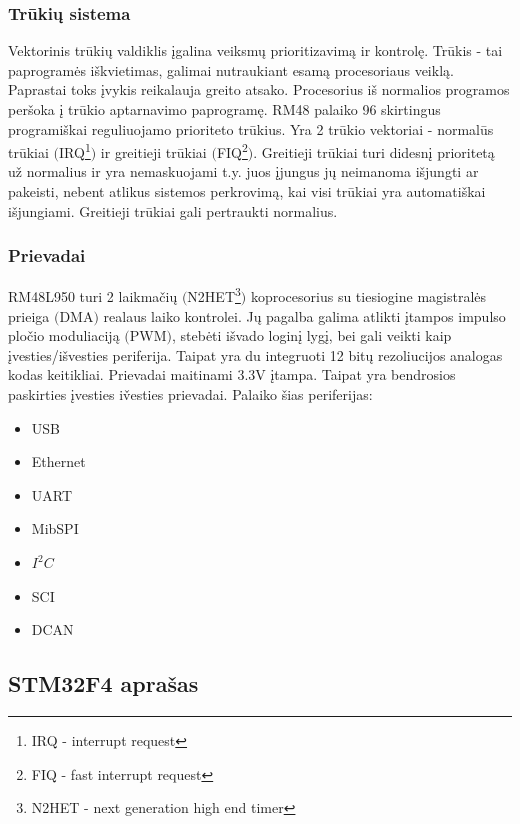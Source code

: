 \documentclass[a4paper, 12pt]{article} %
\begin{document}
\begin{onehalfspacing}
\subsubsection{Tr\=uki\k{u} sistema}
Vektorinis tr\=uki\k{u} valdiklis \k{i}galina veiksm\k{u} prioritizavim\k{a} ir kontrol\k{e}. Tr\=ukis - tai paprogram\.es i\v{s}kvietimas, galimai nutraukiant esam\k{a} procesoriaus veikl\k{a}. Paprastai toks \k{i}vykis reikalauja greito atsako. Procesorius i\v{s} normalios programos per\v{s}oka \k{i} tr\=ukio aptarnavimo paprogram\k{e}. RM48 palaiko 96 skirtingus programi\v{s}kai reguliuojamo prioriteto tr\=ukius. Yra 2 tr\=ukio vektoriai - normal\=us tr\=ukiai $($IRQ\footnote{IRQ - interrupt request}$)$ ir greitieji tr\=ukiai $($FIQ\footnote{FIQ - fast interrupt request}$)$. Greitieji tr\=ukiai turi didesn\k{i} prioritet\k{a} u\v{z} normalius ir yra nemaskuojami t.y. juos \k{i}jungus j\k{u} neimanoma i\v{s}jungti ar pakeisti, nebent atlikus sistemos perkrovim\k{a}, kai visi tr\=ukiai yra automati\v{s}kai i\v{s}jungiami. Greitieji tr\=ukiai gali pertraukti normalius.  


\subsubsection{Prievadai}
RM48L950 turi 2 laikma\v{c}i\k{u} $($N2HET\footnote{N2HET - next generation high end timer}$)$ koprocesorius su tiesiogine magistral\.es prieiga $($DMA$)$ realaus laiko kontrolei. J\k{u} pagalba galima atlikti \k{i}tampos impulso plo\v{c}io moduliacij\k{a} $($PWM$)$, steb\.eti i\v{s}vado login\k{i} lyg\k{i}, bei gali veikti kaip \k{i}vesties/i\v{s}vesties periferija. Taipat yra du integruoti 12 bit\k{u} rezoliucijos analogas kodas keitikliai. Prievadai maitinami 3.3V \k{i}tampa. Taipat yra bendrosios paskirties \k{i}vesties i\v{v}esties prievadai.
Palaiko \v{s}ias periferijas:
\begin{itemize}
\item USB
\item Ethernet
\item UART
\item MibSPI
\item $I^2C$
\item SCI
\item DCAN
\end{itemize}



\subsection{STM32F4 apra\v{s}as}



\end{onehalfspacing}
\end{document}
